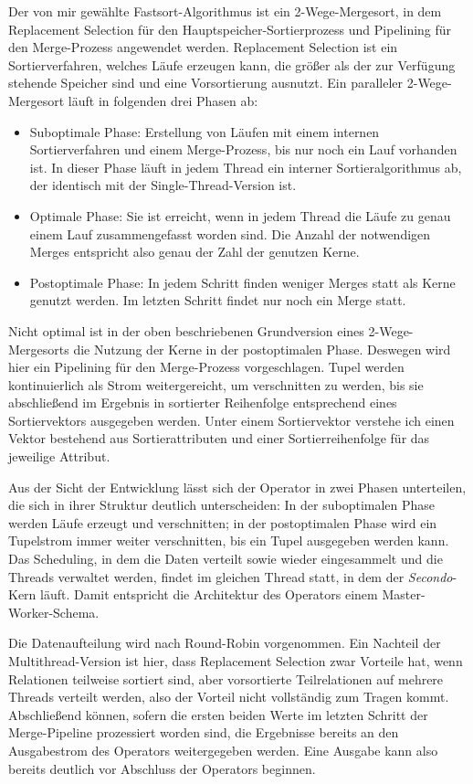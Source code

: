 \documentclass[a4paper,12pt,twoside]{article}
\newcommand{\Fb}[1]{\textit{#1}} %
\begin{document}
Der von mir gewählte Fastsort-Algorithmus ist ein 2-Wege-Mergesort, in dem Replacement Selection für den Hauptspeicher-Sortierprozess und Pipelining für den Merge-Prozess angewendet werden. Replacement Selection ist ein Sortierverfahren, welches Läufe erzeugen kann, die größer als der zur Verfügung stehende Speicher sind und eine Vorsortierung ausnutzt. Ein paralleler 2-Wege-Mergesort läuft in folgenden drei Phasen ab:

\begin{itemize}
	\item Suboptimale Phase: Erstellung von Läufen mit einem internen Sortierverfahren und einem Merge-Prozess, bis nur noch ein Lauf vorhanden ist. In dieser Phase läuft in jedem Thread ein interner Sortieralgorithmus ab, der identisch mit der Single-Thread-Version ist.
	\item Optimale Phase: Sie ist erreicht, wenn in jedem Thread die Läufe zu genau einem Lauf zusammengefasst worden sind. Die Anzahl der notwendigen Merges entspricht also genau der Zahl der genutzen Kerne. 
	\item Postoptimale Phase: In jedem Schritt finden weniger Merges statt als Kerne genutzt werden. Im letzten Schritt findet nur noch ein Merge statt.
\end{itemize}

Nicht optimal ist in der oben beschriebenen Grundversion eines 2-Wege-Mergesorts die Nutzung der Kerne in der postoptimalen Phase. Deswegen wird hier ein Pipelining für den Merge-Prozess vorgeschlagen. Tupel werden kontinuierlich als Strom weitergereicht, um verschnitten zu werden, bis sie abschließend im Ergebnis in sortierter Reihenfolge entsprechend eines Sortiervektors ausgegeben werden. Unter einem Sortiervektor verstehe ich einen Vektor bestehend aus Sortierattributen und einer Sortierreihenfolge für das jeweilige Attribut. 

Aus der Sicht der Entwicklung lässt sich der Operator in zwei Phasen unterteilen, die sich in ihrer Struktur deutlich unterscheiden: In der suboptimalen Phase werden Läufe erzeugt und verschnitten; in der postoptimalen Phase wird ein Tupelstrom immer weiter verschnitten, bis ein Tupel ausgegeben werden kann. Das Scheduling, in dem die Daten verteilt sowie wieder eingesammelt und die Threads verwaltet werden, findet im gleichen Thread statt, in dem der \Fb{Secondo}-Kern läuft. Damit entspricht die Architektur des Operators einem Master-Worker-Schema.

Die Datenaufteilung wird nach Round-Robin vorgenommen. Ein Nachteil der Multithread-Version ist hier, dass Replacement Selection zwar Vorteile hat, wenn Relationen teilweise sortiert sind, aber vorsortierte Teilrelationen auf mehrere Threads verteilt werden, also der Vorteil nicht vollständig zum Tragen kommt. Abschließend können, sofern die ersten beiden Werte im letzten Schritt der Merge-Pipeline prozessiert worden sind, die Ergebnisse bereits an den Ausgabestrom des Operators weitergegeben werden. Eine Ausgabe kann also bereits deutlich vor Abschluss der Operators beginnen.
\end{document}
